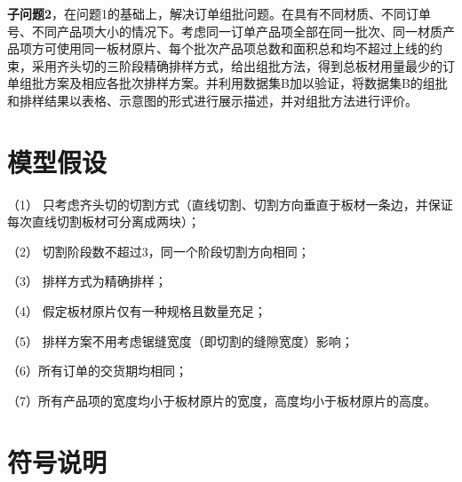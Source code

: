 \documentclass[bwprint]{gmcmthesis}
\begin{document}
\textbf{子问题2}，在问题1的基础上，解决订单组批问题。在具有不同材质、不同订单号、不同产品项大小的情况下。考虑同一订单产品项全部在同一批次、同一材质产品项方可使用同一板材原片、每个批次产品项总数和面积总和均不超过上线的约束，采用齐头切的三阶段精确排样方式，给出组批方法，得到总板材用量最少的订单组批方案及相应各批次排样方案。并利用数据集B加以验证，将数据集B的组批和排样结果以表格、示意图的形式进行展示描述，并对组批方法进行评价。

\newpage

\section{模型假设}

（1） 只考虑齐头切的切割方式（直线切割、切割方向垂直于板材一条边，并保证每次直线切割板材可分离成两块）；

（2） 切割阶段数不超过3，同一个阶段切割方向相同；

（3） 排样方式为精确排样；

（4） 假定板材原片仅有一种规格且数量充足；

（5） 排样方案不用考虑锯缝宽度（即切割的缝隙宽度）影响；

（6）所有订单的交货期均相同；

（7）所有产品项的宽度均小于板材原片的宽度，高度均小于板材原片的高度。

\quad

\section{符号说明}
\end{document}

